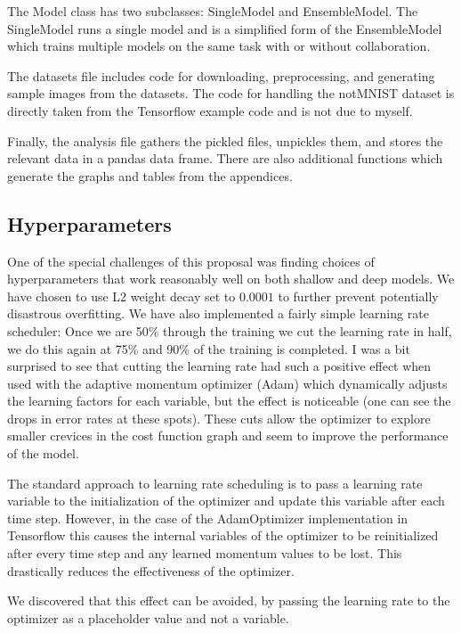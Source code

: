 \documentclass[english,a4paper,oneside]{amsart}
\theoremstyle{definition}
\begin{document}
The Model class has two subclasses: SingleModel and EnsembleModel. The SingleModel runs a single model and is a simplified form of the EnsembleModel which trains multiple models on the same task with or without collaboration. 

The datasets file includes code for downloading, preprocessing, and generating sample images from the datasets. The code for handling the notMNIST dataset is directly taken from the Tensorflow example code and is not due to myself. 

Finally, the analysis file gathers the pickled files, unpickles them, and stores the relevant data in a pandas data frame. There are also additional functions which generate the graphs and tables from the appendices.

\subsection{Hyperparameters}
One of the special challenges of this proposal was finding choices of hyperparameters that work reasonably well on both shallow and deep models. We have chosen to use L2 weight decay set to $0.0001$ to further prevent potentially disastrous overfitting. We have also implemented a fairly simple learning rate scheduler: Once we are 50\% through the training we cut the learning rate in half, we do this again at 75\% and 90\% of the training is completed. I was a bit surprised to see that cutting the learning rate had such a positive effect when used with the adaptive momentum optimizer (Adam) which dynamically adjusts the learning factors for each variable, but the effect is noticeable (one can see the drops in error rates at these spots). These cuts allow the optimizer to explore smaller crevices in the cost function graph and seem to improve the performance of the model.

\begin{remark}
	The standard approach to learning rate scheduling is to pass a learning rate variable to the initialization of the optimizer and update this variable after each time step. However, in the case of the AdamOptimizer implementation in Tensorflow this causes the internal variables of the optimizer to be reinitialized after every time step and any learned momentum values to be lost. This drastically reduces the effectiveness of the optimizer. 

	We discovered that this effect can be avoided, by passing the learning rate to the optimizer as a placeholder value and not a variable.
\end{remark}
\end{document}
